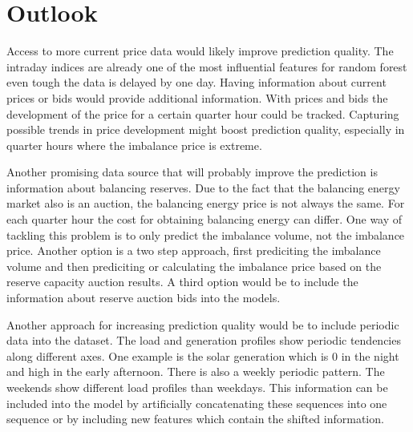 \documentclass[class=scrbook, crop=false]{standalone}
\begin{document}
\section{Outlook}
\label{Section::Outlook}

Access to more current price data would likely improve prediction quality.
The intraday indices are already one of the most influential features for random forest even tough the data is delayed by one day.
Having information about current prices or bids would provide additional information. 
With prices and bids the development of the price for a certain quarter hour could be tracked.
Capturing possible trends in price development might boost prediction quality, especially in quarter hours where the imbalance price is extreme.

Another promising data source that will probably improve the prediction is information about balancing reserves.
Due to the fact that the balancing energy market also is an auction, the balancing energy price is not always the same.
For each quarter hour the cost for obtaining balancing energy can differ.
One way of tackling this problem is to only predict the imbalance volume, not the imbalance price.
Another option is a two step approach, first prediciting the imbalance volume and then prediciting or calculating the imbalance price based on the reserve capacity auction results.
A third option would be to include the information about reserve auction bids into the models. 

Another approach for increasing prediction quality would be to include periodic data into the dataset.
The load and generation profiles show periodic tendencies along different axes. 
One example is the solar generation which is 0 in the night and high in the early afternoon. 
There is also a weekly periodic pattern. 
The weekends show different load profiles than weekdays.
This information can be included into the model by artificially concatenating these sequences into one sequence or by including new features which contain the shifted information.
\end{document}
